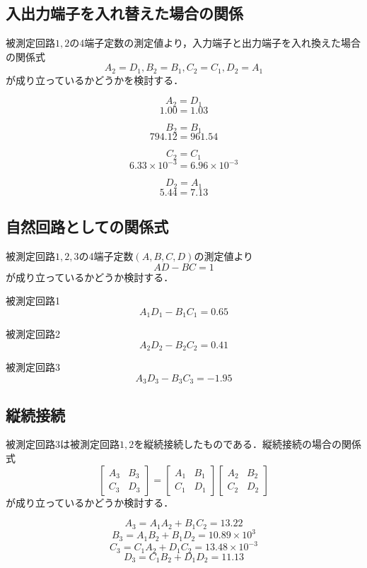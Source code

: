 \subsection{入出力端子を入れ替えた場合の関係}
被測定回路$1,2$の4端子定数の測定値より，入力端子と出力端子を入れ換えた場合の関係式
$$
A_2=D_1, B_2=B_1, C_2=C_1, D_2=A_1
$$
が成り立っているかどうかを検討する．

$$A_2=D_1$$
$$1.00=1.03$$

$$B_2=B_1$$
$$794.12=961.54$$

$$C_2=C_1$$
$$6.33\times10^{-3}=6.96\times10^{-3}$$

$$D_2=A_1$$
$$5.44=7.13$$

\subsection{自然回路としての関係式}
被測定回路$1,2,3$の4端子定数$(A, B, C, D)$の測定値より
$$
A D-B C=1
$$
が成り立っているかどうか検討する． 

\begin{description}
    \item 被測定回路1
    $$
    A_1D_1-B_1C_1=0.65
    $$
    
    \item 被測定回路2
    $$
    A_2D_2-B_2C_2=0.41
    $$
    
    \item 被測定回路3
    $$
    A_3D_3-B_3C_3=-1.95
    $$
    
\end{description}

\subsection{縦続接続}
被測定回路3は被測定回路$1,2$を縦続接続したものである．縦続接続の場合の関係式
$$
\left[\begin{array}{ll}
A_3 & B_3 \\
C_3 & D_3
\end{array}\right]=\left[\begin{array}{ll}
A_1 & B_1 \\
C_1 & D_1
\end{array}\right]\left[\begin{array}{cc}
A_2 & B_2 \\
C_2 & D_2
\end{array}\right]
$$
が成り立っているかどうか検討する．

$$
A_3=A_1A_2+B_1C_2=13.22
$$
$$
B_3=A_1B_2+B_1D_2=10.89\times10^3
$$
$$
C_3=C_1A_2+D_1C_2=13.48\times10^{-3}
$$
$$
D_3=C_1B_2+D_1D_2=11.13
$$
